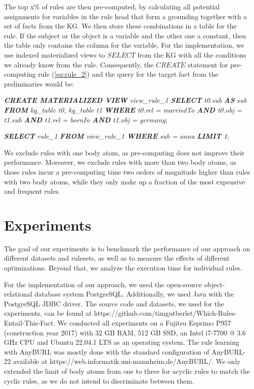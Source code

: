 \documentclass[english]{lni}
\begin{document}
The top x\% of rules are then pre-computed, by calculating all potential assignments for variables in the rule head that form a grounding together with a set of facts from the KG. We then store these combinations in a table for the rule. If the subject or the object is a variable and the other one a constant, then the table only contains the column for the variable. For the implementation, we use indexed materialized views to \(SELECT\) from the KG with all the conditions we already know from the rule. Consequently, the \(CREATE\) statement for pre-computing rule (\ref{eq:rule_2}) and the query for the target fact from the preliminaries would be: 

\textit{\textbf{CREATE MATERIALIZED VIEW} view\_rule\_1 \textbf{SELECT} t0.sub \textbf{AS} sub \textbf{FROM} kg\_table t0,  kg\_table t1 \textbf{WHERE} t0.rel = marriedTo \textbf{AND} t0.obj = t1.sub \textbf{AND} t1.rel = bornIn \textbf{AND} t1.obj = germany};


\textit{\textbf{SELECT} rule\_1 \textbf{FROM} view\_rule\_1  \textbf{WHERE} sub = anna \textbf{LIMIT} 1};

We exclude rules with one body atom, as pre-computing does not improve their performance. Moreover, we exclude rules with more than two body atoms, as those rules incur a pre-computing time two orders of magnitude higher than rules with two body atoms, while they only make up a fraction of the most expensive and frequent rules.

\section{Experiments}
The goal of our experiments is to benchmark the performance of our approach on different datasets and rulesets, as well as to measure the effects of different optimizations. Beyond that, we analyze the execution time for individual rules.

For the implementation of our approach, we used the open-source object-relational database system PostgreSQL. Additionally, we used Java with the PostgreSQL JDBC driver. The source code and datasets, we used for the experiments, can be found at https://github.com/timgutberlet/Which-Rules-Entail-This-Fact. We conducted all experiments on a Fujitsu Esprimo P957 (construction year 2017) with 32 GB RAM, 512 GB SSD, an Intel i7-7700 @ 3.6 GHz CPU and Ubuntu 22.04.1 LTS as an operating system. The rule learning with AnyBURL was mostly done with the standard configuration of AnyBURL-22 available at https://web.informatik.uni-mannheim.de/AnyBURL/. We only extended the limit of body atoms from one to three for acyclic rules to match the cyclic rules, as we do not intend to discriminate between them.
\end{document}
